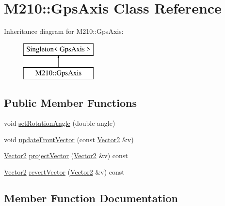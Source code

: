 \hypertarget{class_m210_1_1_gps_axis}{}\section{M210\+:\+:Gps\+Axis Class Reference}
\label{class_m210_1_1_gps_axis}
Inheritance diagram for M210\+:\+:Gps\+Axis\+:\begin{figure}[H]
\begin{center}
\leavevmode
\includegraphics[height=2.000000cm]{class_m210_1_1_gps_axis}
\end{center}
\end{figure}
\subsection*{Public Member Functions}
\begin{DoxyCompactItemize}
\item 
void \mbox{\hyperlink{class_m210_1_1_gps_axis_ac926b543520abc8c87e3692a560954ad}{set\+Rotation\+Angle}} (double angle)
\item 
void \mbox{\hyperlink{class_m210_1_1_gps_axis_a89a2b85d3f6b644fd3b4836dcd69c88b}{update\+Front\+Vector}} (const \mbox{\hyperlink{struct_vector2}{Vector2}} \&v)
\item 
\mbox{\hyperlink{struct_vector2}{Vector2}} \mbox{\hyperlink{class_m210_1_1_gps_axis_a2ca6c7a8f723940b09d00441cff7d4a9}{project\+Vector}} (\mbox{\hyperlink{struct_vector2}{Vector2}} \&v) const
\item 
\mbox{\hyperlink{struct_vector2}{Vector2}} \mbox{\hyperlink{class_m210_1_1_gps_axis_afbcf2ad8d7c70a6e3422272a9abe4086}{revert\+Vector}} (\mbox{\hyperlink{struct_vector2}{Vector2}} \&v) const
\end{DoxyCompactItemize}


\subsection{Member Function Documentation}
\mbox{\label{class_m210_1_1_gps_axis_a2ca6c7a8f723940b09d00441cff7d4a9}} 
